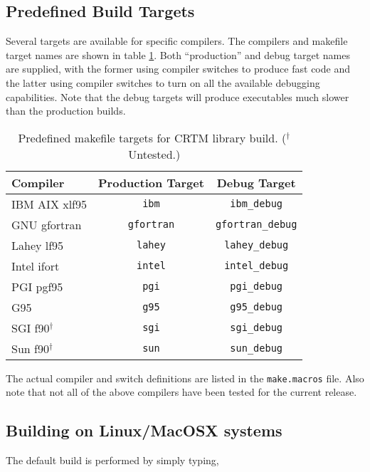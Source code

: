 \subsection{Predefined Build Targets}
Several targets are available for specific compilers. The compilers and makefile target names are shown in table \ref{tab:predefined_build_targets}. Both ``production'' and debug target names are supplied, with the former using compiler switches to produce fast code and the latter using compiler switches to turn on all the available debugging capabilities. Note that the debug targets will produce executables much slower than the production builds. 
\begin{table}[htp]
  \centering
  \begin{tabular}{|l|c|c|}
    \hline
    \sffamily\textbf{Compiler} & \sffamily\textbf{Production Target} & \sffamily\textbf{Debug Target} \\
    \hline\hline
    IBM AIX xlf95     & \texttt{ibm}      & \texttt{ibm\_debug}     \\
    GNU gfortran      & \texttt{gfortran} & \texttt{gfortran\_debug}\\
    Lahey lf95        & \texttt{lahey}    & \texttt{lahey\_debug}   \\
    Intel ifort       & \texttt{intel}    & \texttt{intel\_debug}   \\
    PGI pgf95         & \texttt{pgi}      & \texttt{pgi\_debug}     \\
    G95               & \texttt{g95}      & \texttt{g95\_debug}     \\
    SGI f90$^\dagger$ & \texttt{sgi}      & \texttt{sgi\_debug}     \\
    Sun f90$^\dagger$ & \texttt{sun}      & \texttt{sun\_debug}     \\
    \hline
  \end{tabular}
  \caption{Predefined makefile targets for CRTM library build. ($^\dagger$ Untested.)}
  \label{tab:predefined_build_targets}
\end{table}

The actual compiler and switch definitions are listed in the \texttt{make.macros} file. Also note that not all of the above compilers have been tested for the current release.

\subsection{Building on Linux/MacOSX systems}
The default build is performed by simply typing,

